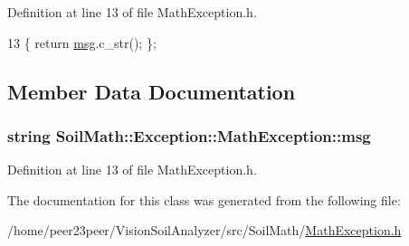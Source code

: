 Definition at line 13 of file Math\+Exception.\+h.


\begin{DoxyCode}
13 \{ \textcolor{keywordflow}{return} \hyperlink{class_soil_math_1_1_exception_1_1_math_exception_a011d990f9e61728a68db3cd80ffc239c}{msg}.c\_str(); \};
\end{DoxyCode}


\subsection{Member Data Documentation}
\hypertarget{class_soil_math_1_1_exception_1_1_math_exception_a011d990f9e61728a68db3cd80ffc239c}{}
\subsubsection[{msg}]{\setlength{\rightskip}{0pt plus 5cm}string Soil\+Math\+::\+Exception\+::\+Math\+Exception\+::msg\hspace{0.3cm}{\ttfamily [private]}}\label{class_soil_math_1_1_exception_1_1_math_exception_a011d990f9e61728a68db3cd80ffc239c}


Definition at line 13 of file Math\+Exception.\+h.



The documentation for this class was generated from the following file\+:\begin{DoxyCompactItemize}
\item 
/home/peer23peer/\+Vision\+Soil\+Analyzer/src/\+Soil\+Math/\hyperlink{_math_exception_8h}{Math\+Exception.\+h}\end{DoxyCompactItemize}
